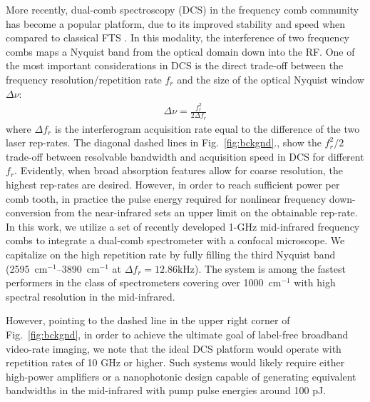 \documentclass{optica-article}
\begin{document}
More recently, dual-comb spectroscopy (DCS) in the frequency comb community has become a popular platform, due to its improved stability and speed when compared to classical FTS \cite{coddingtonDualcombSpectroscopy2016}. In this modality, the interference of two frequency combs maps a Nyquist band from the optical domain down into the RF. One of the most important considerations in DCS is the direct trade-off between the frequency resolution/repetition rate $f_r$ and the size of the optical Nyquist window $\Delta \nu$:
% 
\begin{align}
    \Delta \nu = \frac{f_r^2}{2 \Delta f_r}
\end{align}
% 
where $\Delta f_r$ is the interferogram acquisition rate equal to the difference of the two laser rep-rates. The diagonal dashed lines in \mbox{Fig. \ref{fig:bckgnd}}., show the $f_r^2/2$ trade-off between resolvable bandwidth and acquisition speed in DCS for different $f_r$. Evidently, when broad absorption features allow for coarse resolution, the highest rep-rates are desired. However, in order to reach sufficient power per comb tooth, in practice the pulse energy required for nonlinear frequency down-conversion from the near-infrared sets an upper limit on the obtainable rep-rate. In this work, we utilize a set of recently developed 1-GHz mid-infrared frequency combs \cite{hoghooghiBroadband1GHzMidinfrared2022} to integrate a dual-comb spectrometer with a confocal microscope. We capitalize on the high repetition rate by fully filling the third Nyquist band (\mbox{2595 $\mathrm{cm^{-1}}$}--\mbox{3890 $\mathrm{cm^{-1}}$} at \mbox{$\Delta f_r=12.86\text{kHz}$}). The system is among the fastest performers in the class of spectrometers covering over \mbox{1000 $\mathrm{cm^{-1}}$} with high spectral resolution in the mid-infrared.


However, pointing to the dashed line in the upper right corner of \mbox{Fig. \ref{fig:bckgnd}}, in order to achieve the ultimate goal of label-free broadband video-rate imaging, we note that the ideal DCS platform would operate with repetition rates of 10 GHz or higher. Such systems would likely require either high-power amplifiers or a nanophotonic design capable of generating equivalent bandwidths in the mid-infrared with pump pulse energies around 100 pJ.


\end{document}
